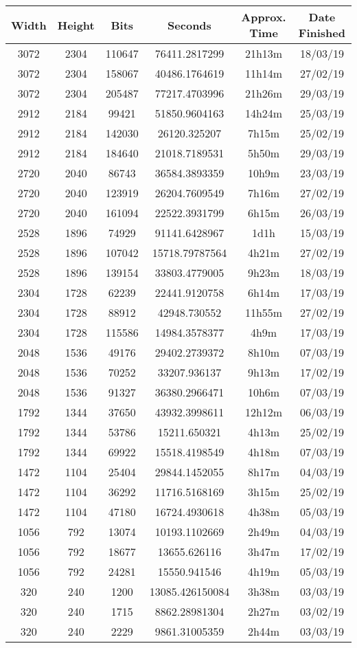   \begin{center}
  \begin{tabular}{ c c c | c c c }
  Width & Height & Bits & Seconds & Approx. Time & Date Finished \\ \hline
  3072 & 2304 & 110647 & 76411.2817299 & 21h13m & 18/03/19 \\
  3072 & 2304 & 158067 & 40486.1764619 & 11h14m & 27/02/19 \\
  3072 & 2304 & 205487 & 77217.4703996 & 21h26m & 29/03/19 \\
  2912 & 2184 & 99421 & 51850.9604163 & 14h24m & 25/03/19 \\
  2912 & 2184 & 142030 & 26120.325207 & 7h15m & 25/02/19 \\
  2912 & 2184 & 184640 & 21018.7189531 & 5h50m & 29/03/19 \\
  2720 & 2040 & 86743 & 36584.3893359 & 10h9m & 23/03/19 \\
  2720 & 2040 & 123919 & 26204.7609549 & 7h16m & 27/02/19 \\
  2720 & 2040 & 161094 & 22522.3931799 & 6h15m & 26/03/19 \\
  2528 & 1896 & 74929 & 91141.6428967 & 1d1h & 15/03/19 \\
  2528 & 1896 & 107042 & 15718.79787564 & 4h21m & 27/02/19 \\
  2528 & 1896 & 139154 & 33803.4779005 & 9h23m & 18/03/19 \\
  2304 & 1728 & 62239 & 22441.9120758 & 6h14m & 17/03/19 \\
  2304 & 1728 & 88912 & 42948.730552 & 11h55m & 27/02/19 \\
  2304 & 1728 & 115586 & 14984.3578377 & 4h9m & 17/03/19 \\
  2048 & 1536 & 49176 & 29402.2739372 & 8h10m & 07/03/19 \\
  2048 & 1536 & 70252 & 33207.936137 & 9h13m & 17/02/19 \\
  2048 & 1536 & 91327 & 36380.2966471 & 10h6m & 07/03/19 \\
  1792 & 1344 & 37650 & 43932.3998611 & 12h12m & 06/03/19 \\
  1792 & 1344 & 53786 & 15211.650321 & 4h13m & 25/02/19 \\
  1792 & 1344 & 69922 & 15518.4198549 & 4h18m & 07/03/19 \\
  1472 & 1104 & 25404 & 29844.1452055 & 8h17m & 04/03/19 \\
  1472 & 1104 & 36292 & 11716.5168169 & 3h15m & 25/02/19 \\
  1472 & 1104 & 47180 & 16724.4930618 & 4h38m & 05/03/19 \\
  1056 & 792 & 13074 & 10193.1102669 & 2h49m & 04/03/19 \\
  1056 & 792 & 18677 & 13655.626116 & 3h47m & 17/02/19 \\
  1056 & 792 & 24281 & 15550.941546 & 4h19m & 05/03/19 \\
  320 & 240 & 1200 & 13085.426150084 & 3h38m & 03/03/19 \\
  320 & 240 & 1715 & 8862.28981304 & 2h27m & 03/02/19 \\
  320 & 240 & 2229 & 9861.31005359 & 2h44m & 03/03/19 \\
  \end{tabular}
  \end{center}

